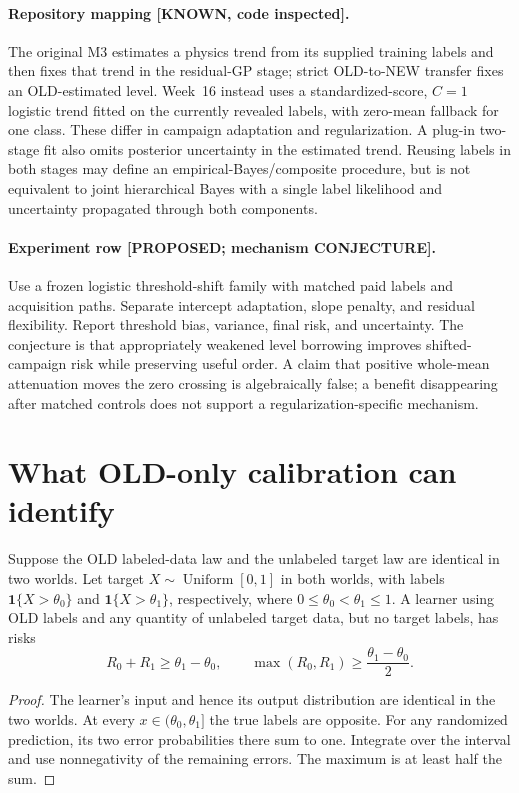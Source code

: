 \paragraph{Repository mapping [KNOWN, code inspected].}
The original M3 estimates a physics trend from its supplied training
labels and then fixes that trend in the residual-GP stage; strict
OLD-to-NEW transfer fixes an OLD-estimated level.  Week~16 instead uses
a standardized-score, $C=1$ logistic trend fitted on the currently
revealed labels, with zero-mean fallback for one class.  These differ
in campaign adaptation and regularization.  A plug-in two-stage fit also
omits posterior uncertainty in the estimated trend.  Reusing labels in
both stages may define an empirical-Bayes/composite procedure, but is
not equivalent to joint hierarchical Bayes with a single label
likelihood and uncertainty propagated through both components.

\paragraph{Experiment row [PROPOSED; mechanism CONJECTURE].}
Use a frozen logistic threshold-shift family with matched paid labels
and acquisition paths.  Separate intercept adaptation, slope penalty,
and residual flexibility.  Report threshold bias, variance, final risk,
and uncertainty.  The conjecture is that appropriately weakened level
borrowing improves shifted-campaign risk while preserving useful order.
A claim that positive whole-mean attenuation moves the zero crossing is
algebraically false; a benefit disappearing after matched controls does
not support a regularization-specific mechanism.

\section{What OLD-only calibration can identify}

\begin{theorem}
Suppose the OLD labeled-data law and the unlabeled target law are
identical in two worlds.  Let target $X\sim\operatorname{Uniform}[0,1]$
in both worlds, with labels $\mathbf{1}\{X>\theta_0\}$ and
$\mathbf{1}\{X>\theta_1\}$, respectively, where
$0\leq\theta_0<\theta_1\leq1$.  A learner using OLD labels and any
quantity of unlabeled target data, but no target labels, has risks
\[
 R_0+R_1\geq\theta_1-\theta_0,
 \qquad \max(R_0,R_1)\geq\frac{\theta_1-\theta_0}{2}.
\]
\end{theorem}
\begin{proof}
The learner's input and hence its output distribution are identical in
the two worlds.  At every $x\in(\theta_0,\theta_1]$ the true labels are
opposite.  For any randomized prediction, its two error probabilities
there sum to one.  Integrate over the interval and use nonnegativity of
the remaining errors.  The maximum is at least half the sum.
\end{proof}

